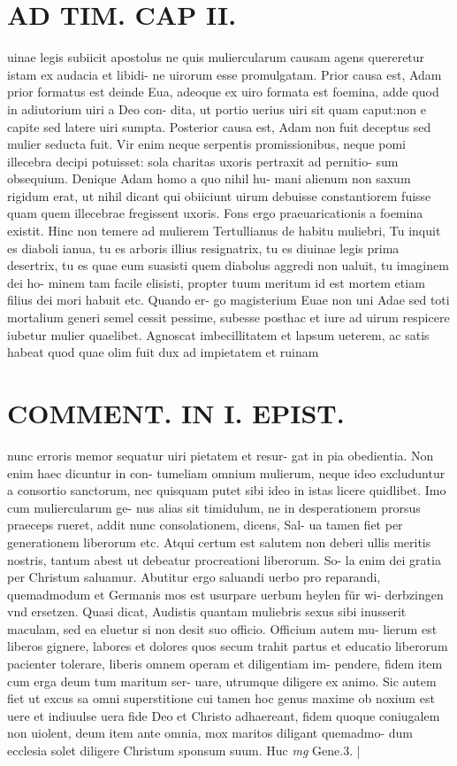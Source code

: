 \documentclass{article}
\begin{document}
\begin{pages}
\section*{AD TIM. CAP II. }
\marginpar{[ p.121 ]}\pstart uinae legis subiicit apostolus ne quis muliercularum causam agens quereretur istam ex audacia et libidi- ne uirorum esse promulgatam. Prior causa est, Adam prior formatus est deinde Eua, adeoque ex uiro formata est foemina, adde quod in adiutorium uiri a Deo con- dita, ut portio uerius uiri sit quam caput:non e capite sed latere uiri sumpta. Posterior causa est, Adam non fuit deceptus sed mulier seducta fuit. Vir enim neque serpentis promissionibus, neque pomi illecebra decipi potuisset: sola charitas uxoris pertraxit ad pernitio- sum obsequium. Denique Adam homo a quo nihil hu- mani alienum non saxum rigidum erat, ut nihil dicant qui obiiciunt uirum debuisse constantiorem fuisse quam quem illecebrae fregissent uxoris. Fons ergo praeuaricationis a foemina existit. Hinc non temere ad mulierem Tertullianus de habitu muliebri, Tu inquit es diaboli ianua, tu es arboris illius resignatrix, tu es diuinae legis prima desertrix, tu es quae eum suasisti quem diabolus aggredi non ualuit, tu imaginem dei ho- minem tam facile elisisti, propter tuum meritum id est mortem etiam filius dei mori habuit etc. Quando er- go magisterium Euae non uni Adae sed toti mortalium generi semel cessit pessime, subesse posthac et iure ad uirum respicere iubetur mulier quaelibet. Agnoscat imbecillitatem et lapsum ueterem, ac satis habeat quod quae olim fuit dux ad impietatem et ruinam  \pend
\section*{COMMENT. IN I. EPIST. }\pstart nunc erroris memor sequatur uiri pietatem et resur- gat in pia obedientia. Non enim haec dicuntur in con- tumeliam omnium mulierum, neque ideo excluduntur a consortio sanctorum, nec quisquam putet sibi ideo in istas licere quidlibet. Imo cum muliercularum ge- nus alias sit timidulum, ne in desperationem prorsus praeceps rueret, addit nunc consolationem, dicens, Sal- ua tamen fiet per generationem liberorum etc. Atqui certum est salutem non deberi ullis meritis nostris, tantum abest ut debeatur procreationi liberorum. So- la enim dei gratia per Christum saluamur. Abutitur ergo saluandi uerbo pro reparandi, quemadmodum et Germanis mos est usurpare uerbum heylen für wi- derbzingen vnd ersetzen. Quasi dicat, Audistis quantam muliebris sexus sibi inusserit maculam, sed ea eluetur si non desit suo officio. Officium autem mu- lierum est liberos gignere, labores et dolores quos secum trahit partus et educatio liberorum pacienter tolerare, liberis omnem operam et diligentiam im- pendere, fidem item cum erga deum tum maritum ser- uare, utrumque diligere ex animo. Sic autem fiet ut excus sa omni superstitione cui tamen hoc genus maxime ob noxium est uere et indiuulse uera fide Deo et Christo adhaereant, fidem quoque coniugalem non uiolent, deum item ante omnia, mox maritos diligant quemadmo- dum ecclesia solet diligere Christum sponsum suum. Huc  \pend
\textit{mg}
\footnotesize Gene.3. 
\normalsize| 

\end{pages}
\end{document}
